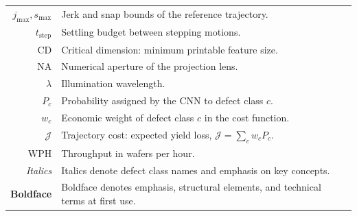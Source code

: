 \begin{tabular}{rl}
        $j_{\max},s_{\max}$ & Jerk and snap bounds of the reference trajectory.\\
        $t_{\mathrm{step}}$ & Settling budget between stepping motions.\\
        $\mathrm{CD}$ & Critical dimension: minimum printable feature size.\\
        $\mathrm{NA}$ & Numerical aperture of the projection lens.\\
        $\lambda$ & Illumination wavelength.\\
        $P_c$ & Probability assigned by the CNN to defect class $c$.\\
        $w_c$ & Economic weight of defect class $c$ in the cost function.\\
        $\mathcal{J}$ & Trajectory cost: expected yield loss, $\mathcal{J}=\sum_c w_c P_c$.\\
        $\mathrm{WPH}$ & Throughput in wafers per hour.\\
        \textit{Italics} & Italics denote defect class names and emphasis on key concepts.\\
        \textbf{Boldface} & Boldface denotes emphasis, structural elements, and technical terms at first use.
\end{tabular}
